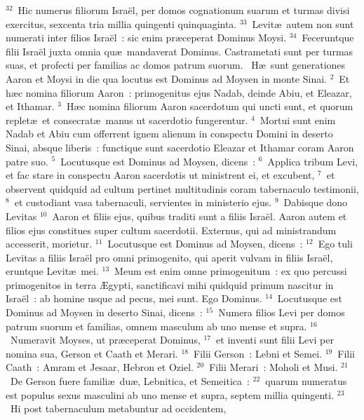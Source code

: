 ${}^{32}$~Hic numerus filiorum Isra\"el, per domos cognationum suarum et turmas divisi exercitus, sexcenta tria millia quingenti quinquaginta.
${}^{33}$~Levit\ae\ autem non sunt numerati inter filios Isra\"el~: sic enim pr\ae ceperat Dominus Moysi.
${}^{34}$~Feceruntque filii Isra\"el juxta omnia qu\ae\ mandaverat Dominus. Castrametati sunt per turmas suas, et profecti per familias ac domos patrum suorum.
~\lettrine[lines=10,image=true,loversize=0.05,lraise=-0.03]{H}{}\ae\ sunt generationes Aaron et Moysi in die qua locutus est Dominus ad Moysen in monte Sinai.
${}^{2}$~Et h\ae c nomina filiorum Aaron~: primogenitus ejus Nadab, deinde Abiu, et Eleazar, et Ithamar.
${}^{3}$~H\ae c nomina filiorum Aaron sacerdotum qui uncti sunt, et quorum replet\ae\ et consecrat\ae\ manus ut sacerdotio fungerentur.
${}^{4}$~Mortui sunt enim Nadab et Abiu cum offerrent ignem alienum in conspectu Domini in deserto Sinai, absque liberis~: functique sunt sacerdotio Eleazar et Ithamar coram Aaron patre suo.
${}^{5}$~Locutusque est Dominus ad Moysen, dicens~:
${}^{6}$~Applica tribum Levi, et fac stare in conspectu Aaron sacerdotis ut ministrent ei, et excubent,
${}^{7}$~et observent quidquid ad cultum pertinet multitudinis coram tabernaculo testimonii,
${}^{8}$~et custodiant vasa tabernaculi, servientes in ministerio ejus.
${}^{9}$~Dabisque dono Levitas
${}^{10}$~Aaron et filiis ejus, quibus traditi sunt a filiis Isra\"el. Aaron autem et filios ejus constitues super cultum sacerdotii. Externus, qui ad ministrandum accesserit, morietur.
${}^{11}$~Locutusque est Dominus ad Moysen, dicens~:
${}^{12}$~Ego tuli Levitas a filiis Isra\"el pro omni primogenito, qui aperit vulvam in filiis Isra\"el, eruntque Levit\ae\ mei.
${}^{13}$~Meum est enim omne primogenitum~: ex quo percussi primogenitos in terra \AE gypti, sanctificavi mihi quidquid primum nascitur in Isra\"el~: ab homine usque ad pecus, mei sunt. Ego Dominus.
${}^{14}$~Locutusque est Dominus ad Moysen in deserto Sinai, dicens~:
${}^{15}$~Numera filios Levi per domos patrum suorum et familias, omnem masculum ab uno mense et supra.
${}^{16}$~Numeravit Moyses, ut pr\ae ceperat Dominus,
${}^{17}$~et inventi sunt filii Levi per nomina sua, Gerson et Caath et Merari.
${}^{18}$~Filii Gerson~: Lebni et Semei.
${}^{19}$~Filii Caath~: Amram et Jesaar, Hebron et Oziel.
${}^{20}$~Filii Merari~: Moholi et Musi.
${}^{21}$~De Gerson fuere famili\ae\ du\ae , Lebnitica, et Semeitica~:
${}^{22}$~quarum numeratus est populus sexus masculini ab uno mense et supra, septem millia quingenti.
${}^{23}$~Hi post tabernaculum metabuntur ad occidentem,
